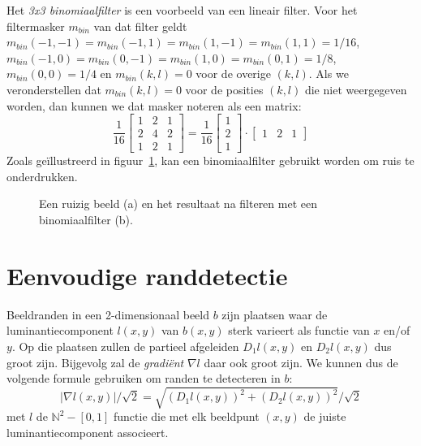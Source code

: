 Het \emph{3x3 binomiaalfilter} is een voorbeeld van een lineair filter. Voor het filtermasker 
$m_{bin}$ van dat filter geldt $m_{bin}(-1,-1)=m_{bin}(-1,1)=m_{bin}(1,-1)=m_{bin}(1,1)=1/16$, 
$m_{bin}(-1,0)=m_{bin}(0,-1)=m_{bin}(1,0)=m_{bin}(0,1)=1/8$, $m_{bin}(0,0)=1/4$ en 
$m_{bin}(k,l)=0$ voor de overige $(k,l)$. Als we veronderstellen dat $m_{bin}(k,l)=0$ voor de 
posities $(k,l)$ die niet weergegeven worden, dan kunnen we dat masker noteren als een matrix:
$$
\frac{1}{16}\left[ \begin{array}{ccc} 1 & 2 & 1\\ 2 & 4 & 2\\ 1 & 2 & 1 \end{array} \right]
= \frac{1}{16}\left[ \begin{array}{c} 1\\ 2\\ 1 \end{array} \right] \cdot 
\left[ \begin{array}{ccc} 1 & 2 & 1 \end{array} \right]
$$
Zoals ge\"illustreerd in figuur~\ref{fig:indische_ruizig_en_binom}, kan een binomiaalfilter gebruikt worden om ruis te onderdrukken.

\begin{figure}[tb]
\begin{center}
\hspace{1cm}
\caption{\label{fig:indische_ruizig_en_binom}Een ruizig beeld (a) en het resultaat na filteren met een binomiaalfilter (b).}
\end{center}
\end{figure}

\section{Eenvoudige randdetectie}
\label{sectie:randdetectie}

Beeldranden in een 2-dimensionaal beeld $b$ zijn plaatsen waar de luminantiecomponent $l(x,y)$ van $b(x,y)$ 
sterk varieert als functie van $x$ en/of $y$. Op die plaatsen zullen de partieel afgeleiden $D_1 l(x,y)$ en 
$D_2 l(x,y)$ dus groot zijn. Bijgevolg zal de \emph{gradi\"ent} $\nabla l$ daar ook groot zijn. We kunnen 
dus de volgende formule gebruiken om randen te detecteren in $b$: 
$$
|\nabla l(x,y)| / \sqrt{2} = \sqrt{(D_1 l(x,y))^2 + (D_2 l(x,y))^2} / \sqrt{2}
$$ 
met $l$ de $\mathbb{N}^2 - [0,1]$ functie die met elk beeldpunt $(x,y)$ de juiste luminantiecomponent associeert.


